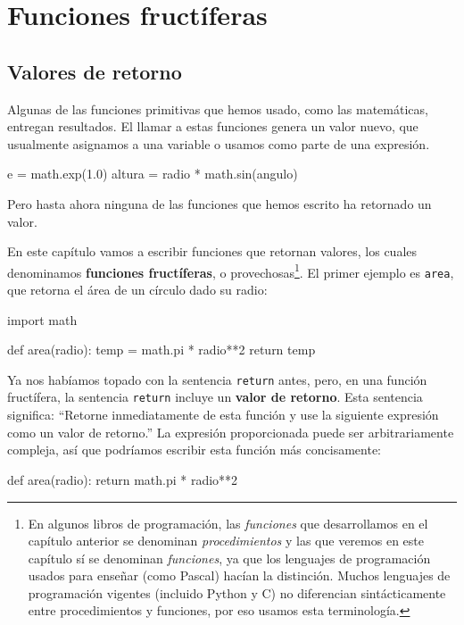 
\chapter{Funciones fructíferas }

\label{funcReturn}

\section{Valores de retorno}


Algunas de las funciones primitivas que hemos usado, como las matemáticas,
entregan resultados. El llamar a estas funciones genera un valor nuevo,
que usualmente asignamos a una variable o usamos como parte de una
expresión.
\begin{pythoncode}
e = math.exp(1.0)
altura = radio * math.sin(angulo)
\end{pythoncode}

Pero hasta ahora ninguna de las funciones que hemos escrito ha retornado
un valor.

En este capítulo vamos a escribir funciones que retornan valores,
los cuales denominamos \textbf{funciones fructíferas}, o provechosas\footnote{En algunos libros de programación, las \textit{funciones} que desarrollamos
en el capítulo anterior se denominan \textit{procedimientos} y las
que veremos en este capítulo sí se denominan \textit{funciones}, ya
que los lenguajes de programación usados para enseñar (como Pascal)
hacían la distinción. Muchos lenguajes de programación vigentes (incluido
Python y C) no diferencian sintácticamente entre procedimientos y
funciones, por eso usamos esta terminología.}. El primer ejemplo es \texttt{area}, que retorna el área de un círculo
dado su radio:
\begin{pythoncode}
import math

def area(radio):
  temp = math.pi * radio**2
  return temp
\end{pythoncode}

Ya nos habíamos topado con la sentencia \texttt{return} antes, pero,
en una función fructífera, la sentencia \texttt{return} incluye un
\textbf{valor de retorno}. Esta sentencia significa: ``Retorne inmediatamente
de esta función y use la siguiente expresión como un valor de retorno.''
La expresión proporcionada puede ser arbitrariamente compleja, así
que podríamos escribir esta función más concisamente:

\begin{pythoncode}
def area(radio):
  return math.pi * radio**2
\end{pythoncode}
 

